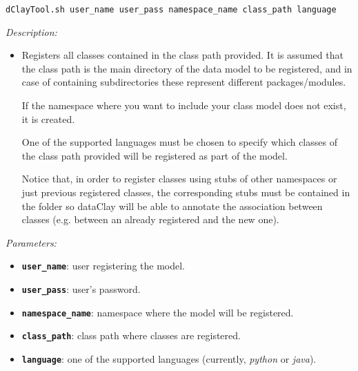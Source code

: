 
\begin{dBox}
\texttt{dClayTool.sh  \newline user\_name user\_pass namespace\_name class\_path language 
}
\LINE

{\it Description:}

\begin{itemize}
    \item Registers all classes contained in the class path provided. It is assumed that the class path is the main directory of the data model to be registered, and in case of containing subdirectories these represent different packages/modules.
    
    If the namespace where you want to include your class model does not exist, it is created.
    
    One of the supported languages must be chosen to specify which classes of the class path provided will be registered as part of the model.
    
    Notice that, in order to register classes using stubs of other namespaces or just previous registered classes, the corresponding stubs must be contained in the folder so dataClay will be able to annotate the association between classes (e.g. between an already registered and the new one).
   
\end{itemize}

{\it Parameters:}

\begin{itemize}
    \item \texttt{\bfseries user\_name}: user registering the model.
    \item \texttt{\bfseries user\_pass}: user's password.
    \item \texttt{\bfseries namespace\_name}: namespace where the model will be registered.
    \item \texttt{\bfseries class\_path}: class path where classes are registered.
    \item \texttt{\bfseries language}: one of the supported languages (currently, \textit{python} or \textit{java}).
\end{itemize}


\end{dBox}
